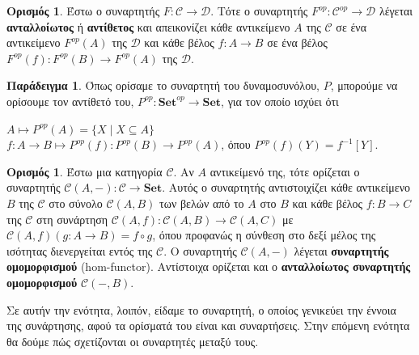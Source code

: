 \documentclass [a4paper,11pt] {book}
\theoremstyle{definition}
\newtheorem{example}[theorem]{Παράδειγμα}
\theoremstyle{definition}
\newtheorem{definition}[theorem]{Ορισμός}
\begin{document}
\begin{definition}
Έστω ο συναρτητής $F: \mathcal{C}\to \mathcal{D}$. Τότε ο συναρτητής $F^{op}: \mathcal{C}^{op}\to \mathcal{D}$ λέγεται \textbf{ανταλλοίωτος} ή \textbf{αντίθετος} και απεικονίζει κάθε αντικείμενο $A$ της $\mathcal{C}$ σε ένα αντικείμενο $F^{op}(A)$ της $\mathcal{D}$ και κάθε βέλος $f:A\to B$ σε ένα βέλος $F^{op}(f):F^{op}(B)\to F^{op}(A)$ της $\mathcal{D}$.
\end{definition}
\begin{example}
Όπως ορίσαμε το συναρτητή του δυναμοσυνόλου, $P$, μπορούμε να ορίσουμε τον αντίθετό του, $P^{op}:\textbf{Set}^{op}\to \textbf{Set}$, για τον οποίο ισχύει ότι
\begin{center}
$A \mapsto P^{op}(A)=\{X\mid X \subseteq A\}$\\
$f:A\to B \mapsto P^{op}(f):P^{op}(B)\to P^{op}(A)$, όπου $P^{op}(f)(Y)=f^{-1}[Y]$.
\end{center}\end{example}

\begin{definition}\label{homsetFunctor}
Έστω μια κατηγορία $\mathcal{C}$. Αν $A$ αντικείμενό της, τότε ορίζεται ο συναρτητής $\mathcal{C}(A,-):\mathcal{C}\to \textbf{Set}$. Αυτός ο συναρτητής αντιστοιχίζει κάθε αντικείμενο $B$ της $\mathcal{C}$ στο σύνολο $\mathcal{C}(A,B)$ των βελών από το $A$ στο $B$ και κάθε βέλος $f:B\to C$ της $\mathcal{C}$ στη συνάρτηση $\mathcal{C}(A,f):\mathcal{C}(A,B)\to \mathcal{C}(A,C)$ με $\mathcal{C}(A,f)(g:A \to B)=f\circ g$, όπου προφανώς η σύνθεση στο δεξί μέλος της ισότητας διενεργείται εντός της $\mathcal{C}$. Ο συναρτητής $\mathcal{C}(A,-)$ λέγεται \textbf{συναρτητής ομομορφισμού} (hom-functor). Αντίστοιχα ορίζεται και ο \textbf{ανταλλοίωτος συναρτητής ομομορφισμού} $\mathcal{C}(-,B)$.
\end{definition}
Σε αυτήν την ενότητα, λοιπόν, είδαμε το συναρτητή, ο οποίος γενικεύει την έννοια της συνάρτησης, αφού τα ορίσματά του είναι και συναρτήσεις. Στην επόμενη ενότητα θα δούμε πώς σχετίζονται οι συναρτητές μεταξύ τους.
\end{document}
